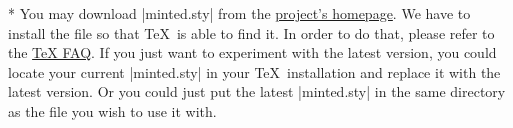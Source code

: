 \begin{paracol}{2}
\switchcolumn
\switchcolumn[0]*%
You may download |minted.sty| from the
\href{https://github.com/gpoore/minted}{project's homepage}.  We have to install the file so that \TeX\ is able to find it.
In order to do that, please refer to the
\href{http://www.tex.ac.uk/cgi-bin/texfaq2html?label=inst-wlcf}{\TeX{} FAQ}.
If you just want to experiment with the latest version, you could locate your current |minted.sty| in your \TeX\ installation and replace it with the latest version.  Or you could just put the latest |minted.sty| in the same directory as the file you wish to use it with.

\end{paracol}